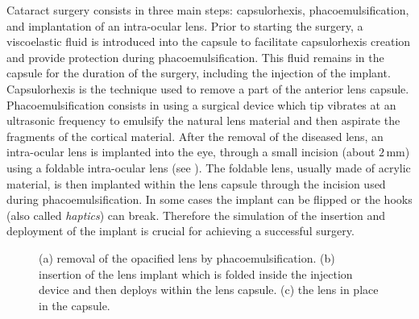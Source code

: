 Cataract surgery consists in three main steps: capsulorhexis, phacoemulsification, and implantation of an intra-ocular lens. Prior to starting the surgery, a viscoelastic fluid is introduced into the capsule to facilitate capsulorhexis creation and provide protection during phacoemulsification. This fluid remains in the capsule for the duration of the surgery, including the injection of the implant. Capsulorhexis is the technique used to remove a part of the anterior lens capsule. Phacoemulsification consists in using a surgical device which tip vibrates at an ultrasonic frequency to emulsify the natural lens material and then aspirate the fragments of the cortical material. After the removal of the diseased lens, an intra-ocular lens is implanted into the eye, through a small incision (about $2\,$mm) using a foldable intra-ocular lens (see ). The foldable lens, usually made of acrylic material, is then implanted within the lens capsule through the incision used during phacoemulsification. In some cases the implant can be flipped or  the hooks (also called \emph{haptics}) can break. Therefore the simulation of the insertion and deployment of the implant is crucial for achieving a successful surgery.
%
\begin{figure}[ht]
\centering 
{}
\hspace{1cm} 
\hspace{1cm} 
\caption [Steps of cataract surgery] {(a) removal of the opacified lens by phacoemulsification. (b) insertion of the lens implant which is folded inside the injection device and then deploys within the lens capsule. (c) the lens in place in the capsule.}
\label{chap9:fig-surgery}
\end{figure}

